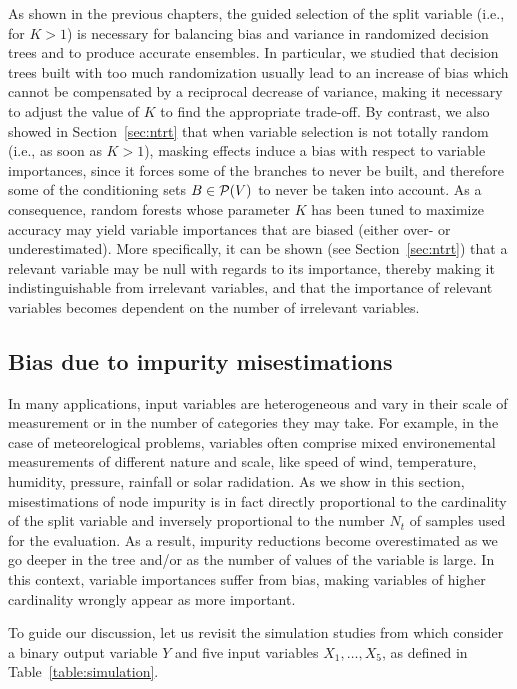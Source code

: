 As shown in the previous chapters, the guided selection of the split variable
(i.e., for $K>1$) is necessary for balancing bias and variance in  randomized
decision trees and to produce accurate ensembles. In particular, we studied
that decision trees built with too much randomization usually lead to an
increase of bias which cannot be compensated by a reciprocal decrease of
variance, making it necessary to adjust the value of $K$ to find the
appropriate trade-off. By contrast, we also showed in Section~\ref{sec:ntrt}
that when variable selection is not totally random (i.e., as soon as $K>1$),
masking effects induce a bias with respect to variable importances, since it
forces some of the branches to never be built, and therefore some of the
conditioning sets $B \in {\cal P}(V)$ to never be taken into account. As a
consequence, random forests whose parameter $K$ has been tuned to maximize
accuracy may yield variable importances that are biased (either
over- or underestimated). More specifically, it can be shown (see
Section~\ref{sec:ntrt}) that a relevant variable may be null with regards to
its importance, thereby making it indistinguishable from irrelevant variables,
and that the importance of relevant variables becomes dependent on the number
of irrelevant variables.


\subsection{Bias due to impurity misestimations}
\label{sec:7:bias:high}

In many applications, input variables are heterogeneous and vary in their scale
of measurement or in the number of categories they may take. For example, in
the case of meteorelogical problems, variables often comprise mixed
environemental measurements of different nature and scale,   like speed of
wind, temperature, humidity, pressure, rainfall or solar radidation. As we show
in this section, misestimations of node impurity is in fact directly
proportional to the cardinality of the split variable and inversely
proportional to the number $N_t$ of samples used for the evaluation. As a
result, impurity reductions become overestimated as we go deeper in the tree
and/or as the number of values of the variable is large. In this context,
variable importances suffer from bias, making variables of higher cardinality
wrongly appear as more important.

To guide our discussion, let us revisit the simulation studies from
\citep{strobl:2007b} which consider a binary output variable $Y$ and five
input variables $X_1,\dots,X_5$, as defined in Table~\ref{table:simulation}.

